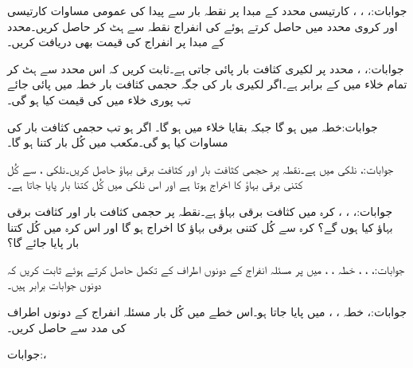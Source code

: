 جوابات:، ، ، 
کارتیسی محدد کے مبدا  پر نقطہ بار  سے پیدا  کی عمومی مساوات کارتیسی اور کروی محدد میں حاصل کرتے ہوئے  کی انفراج نقطہ  سے ہٹ کر حاصل کریں۔محدد کے مبدا پر انفراج کی قیمت بھی دریافت کریں۔  

جوابات:، ،
 محدد پر لکیری کثافت بار  پائی جاتی ہے۔ثابت کریں کہ اس محدد سے ہٹ کر تمام خلاء میں  کے برابر ہے۔اگر لکیری بار کی جگہ حجمی کثافت بار  خطہ  میں پائی جائے تب پوری خلاء میں  کی قیمت کیا ہو گی۔

جوابات:خطہ  میں  ہو گا جبکہ بقایا خلاء میں  ہو گا۔
اگر  ہو تب حجمی کثافت بار کی مساوات کیا ہو گی۔مکعب  میں کُل بار کتنا ہو گا۔

جوابات:، 
نلکی  میں  ہے۔نقطہ  پر حجمی کثافت بار اور کثافت برقی بہاؤ حاصل کریں۔نلکی ،  سے کُل کتنی برقی بہاؤ کا اخراج ہوتا ہے اور اس نلکی میں کُل کتنا بار پایا جاتا ہے۔

جوابات:، ، ،
کرہ  میں کثافت برقی بہاؤ  ہے۔نقطہ  پر حجمی کثافت بار اور کثافت برقی بہاؤ کیا ہوں گے؟ کرہ  سے کُل کتنی برقی بہاؤ کا اخراج ہو گا اور اس کرہ میں کُل کتنا بار پایا جائے گا؟

جوابات:، ، ، 
خطہ ، ،  میں  پر مسئلہ انفراج کے دونوں اطراف کے تکمل حاصل کرتے ہوئے ثابت کریں کہ دونوں جوابات برابر ہیں۔

جوابات:،  
خطہ ، ،  میں  پایا جاتا ہو۔اس خطے میں کُل بار مسئلہ انفراج کے دونوں اطراف کی مدد سے حاصل کریں۔

جوابات:، 
